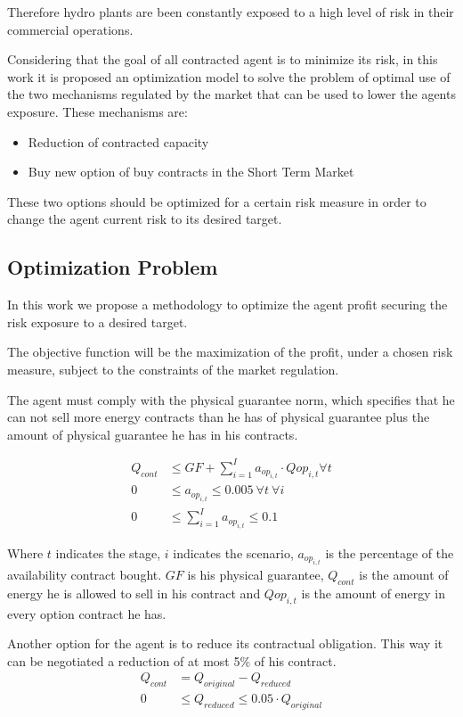 \documentclass[a4paper]{IEEEtran}
\begin{document}
Therefore hydro plants are been constantly exposed to a high level of risk in their commercial operations.

Considering that the goal of all contracted agent is to minimize its risk, in this work it is proposed an optimization model to solve the problem of optimal use of the two mechanisms regulated by the market that can be used to lower the agents exposure. These mechanisms are:

\begin{itemize}
	\item Reduction of contracted capacity
	\item Buy new option of buy contracts in the 	Short Term Market
\end{itemize}

These two options should be optimized for a certain risk measure in order to change the agent current risk to its desired target.

\subsection{Optimization Problem} 
In this work we propose a methodology to optimize the agent profit securing the risk exposure to a desired target.

The objective function will be the maximization of the profit, under a chosen risk measure, subject to the constraints of the market regulation.

The agent must comply with the physical guarantee norm, which specifies that he can not sell more energy contracts than he has of physical guarantee plus the amount of physical guarantee he has in his contracts.

\begin{align}
	Q_{cont} &\leq GF + \sum_{i=1}^{I} a_{op_{i,t}} \cdot Q{op_{i,t}} \forall t \\
	0 &\leq a_{op_{i,t}} \leq 0.005 \ \forall t \ \forall i \\
	0 &\leq \sum_{i=1}^{I} a_{op_{i,t}} \leq 0.1
\end{align}

Where $t$ indicates the stage, $i$ indicates the scenario, $a_{op_{i,t}}$ is the percentage of the availability contract bought. $GF$ is his physical guarantee, $Q_{cont}$ is the amount of energy he is allowed to sell in his contract and $Q{op_{i,t}}$ is the amount of energy in every option contract he has.

Another option for the agent is to reduce its contractual obligation. This way it can be negotiated a reduction of at most 5\% of his contract.
\begin{align}
	Q_{cont} &= Q_{original} - Q_{reduced}\\
	0 &\leq Q_{reduced} \leq 0.05 \cdot Q_{original}
\end{align}
\end{document}
